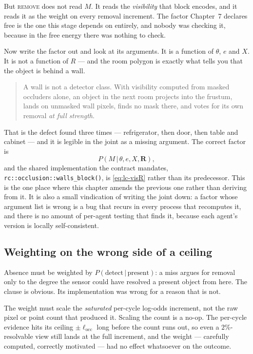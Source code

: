 \documentclass[11pt,a4paper]{report}
\newcommand{\given}{\,|\,}
\newcommand{\stage}[1]{\textsc{#1}}
\newcommand{\Remove}{\stage{remove}}
\begin{document}
But \Remove{} does not read $M$. It reads the \emph{visibility} that block encodes, and it reads it
as the weight on every removal increment. The factor Chapter~7 declares free is the one this stage
depends on entirely, and nobody was checking it, because in the free energy there was nothing to
check.

Now write the factor out and look at its arguments. It is a function of $\theta$, $e$ and $X$. It is
not a function of $R$ --- and the room polygon is exactly what tells you that the object is behind a
wall.

\begin{quote}
A wall is not a detector class. With visibility computed from masked occluders alone, an object in
the next room projects into the frustum, lands on unmasked wall pixels, finds no mask there, and
votes for its own removal \emph{at full strength}.
\end{quote}

\noindent
That is the defect found three times --- refrigerator, then door, then table and cabinet --- and it
is legible in the joint as a missing argument. The correct factor is
\begin{equation}
P\!\left(M\given\theta,e,X,\mathbf{R}\right),
\label{eq:lc-visR}
\end{equation}
and the shared implementation the contract mandates, \texttt{rc::occlusion::walls\_block()}, is
\eqref{eq:lc-visR} rather than its predecessor. This is the one place where this chapter amends the
previous one rather than deriving from it. It is also a small vindication of writing the joint down:
a factor whose argument list is wrong is a bug that recurs in every process that recomputes it, and
there is no amount of per-agent testing that finds it, because each agent's version is locally
self-consistent.

\subsection{Weighting on the wrong side of a ceiling}
\label{sec:saturation}

Absence must be weighted by $P(\text{detect}\given\text{present})$: a miss argues for removal only to
the degree the sensor could have resolved a present object from here. The clause is obvious. Its
implementation was wrong for a reason that is not.

The weight must scale the \emph{saturated} per-cycle log-odds increment, not the raw pixel or point
count that produced it. Scaling the count is a no-op. The per-cycle evidence hits its ceiling
$\pm\ell_{\mathrm{occ}}$ long before the count runs out, so even a $2\%$-resolvable view still lands
at the full increment, and the weight --- carefully computed, correctly motivated --- had no effect
whatsoever on the outcome.
\end{document}

